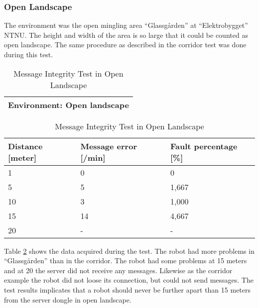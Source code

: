 \newpage
\subsubsection{Open Landscape}
The environment was the open mingling area ``Glassgården'' at ``Elektrobygget'' NTNU. The height and width of the area is so large that it could be counted as open landscape.
The same procedure as described in the corridor test was done during this test.

\begin{table}[ht]
\begin{center}
 \begin{tabular}{|p{130pt}|} 
 \hline
 Environment: \textbf{Open landscape}\\
 \hline
 \end{tabular}
 \begin{tabular}{|p{90pt}|p{100pt}|p{90pt}|}
 \hline
 Distance [meter] & Message error [/min] &  Fault percentage [\%]\\
 \hline
 1		        &   0 		&	0    \\
 5              &   5  		&	1,667\\
 10             &   3  		&	1,000\\
 15				&	14 		&	4,667\\
 20				&	-  		&	-	\\
 \hline
\end{tabular}
\end{center}
\caption{Message Integrity Test in Open Landscape}
\label{tab:messintegrityopen}
\end{table}

Table \ref{tab:messintegrityopen} shows the data acquired during the test. The robot had more problems in ``Glassgården'' than in the corridor. The robot had some problems at 15 meters and at 20 the server did not receive any messages. Likewise as the corridor example the robot did not loose its connection, but could not send messages. The test results implicates that a robot should never be further apart than 15 meters from the server dongle in open landscape.